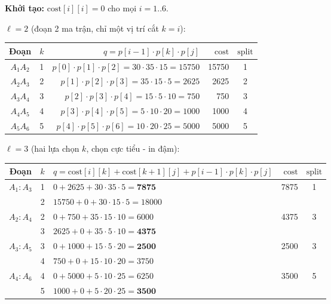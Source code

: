 \documentclass[12pt,a4paper]{article}
\begin{document}
\textbf{Khởi tạo:} $\mathrm{cost}[i][i] = 0$ cho mọi $i = 1..6$.

\textbf{$\ell = 2$} (đoạn 2 ma trận, chỉ một vị trí cắt $k = i$):

\begin{table}[H]
\centering\small
\begin{tabular}{c c r r c}
\toprule
Đoạn & $k$ & $q = p[i{-}1] \cdot p[k] \cdot p[j]$ & $\mathrm{cost}$ & $\mathrm{split}$ \\
\midrule
$A_1A_2$ & 1 & $p[0] \cdot p[1] \cdot p[2] = 30 \cdot 35 \cdot 15 = 15750$ & 15750 & 1 \\
$A_2A_3$ & 2 & $p[1] \cdot p[2] \cdot p[3] = 35 \cdot 15 \cdot 5 = 2625$ & 2625 & 2 \\
$A_3A_4$ & 3 & $p[2] \cdot p[3] \cdot p[4] = 15 \cdot 5 \cdot 10 = 750$ & 750 & 3 \\
$A_4A_5$ & 4 & $p[3] \cdot p[4] \cdot p[5] = 5 \cdot 10 \cdot 20 = 1000$ & 1000 & 4 \\
$A_5A_6$ & 5 & $p[4] \cdot p[5] \cdot p[6] = 10 \cdot 20 \cdot 25 = 5000$ & 5000 & 5 \\
\bottomrule
\end{tabular}
\end{table}

\textbf{$\ell = 3$} (hai lựa chọn $k$, chọn cực tiểu - in đậm):

\begin{table}[H]
\centering\small
\begin{tabular}{c c l r c}
\toprule
Đoạn & $k$ & $q = \mathrm{cost}[i][k] + \mathrm{cost}[k+1][j] + p[i{-}1] \cdot p[k] \cdot p[j]$ & $\mathrm{cost}$ & $\mathrm{split}$ \\
\midrule
\multirow{2}{*}{$A_1{:}A_3$} & 1 & $0 + 2625 + 30 \cdot 35 \cdot 5 = \mathbf{7875}$ & \multirow{2}{*}{7875} & \multirow{2}{*}{1} \\
                             & 2 & $15750 + 0 + 30 \cdot 15 \cdot 5 = 18000$ & & \\
\midrule
\multirow{2}{*}{$A_2{:}A_4$} & 2 & $0 + 750 + 35 \cdot 15 \cdot 10 = 6000$ & \multirow{2}{*}{4375} & \multirow{2}{*}{3} \\
                             & 3 & $2625 + 0 + 35 \cdot 5 \cdot 10 = \mathbf{4375}$ & & \\
\midrule
\multirow{2}{*}{$A_3{:}A_5$} & 3 & $0 + 1000 + 15 \cdot 5 \cdot 20 = \mathbf{2500}$ & \multirow{2}{*}{2500} & \multirow{2}{*}{3} \\
                             & 4 & $750 + 0 + 15 \cdot 10 \cdot 20 = 3750$ & & \\
\midrule
\multirow{2}{*}{$A_4{:}A_6$} & 4 & $0 + 5000 + 5 \cdot 10 \cdot 25 = 6250$ & \multirow{2}{*}{3500} & \multirow{2}{*}{5} \\
                             & 5 & $1000 + 0 + 5 \cdot 20 \cdot 25 = \mathbf{3500}$ & & \\
\bottomrule
\end{tabular}
\end{table}
\end{document}
